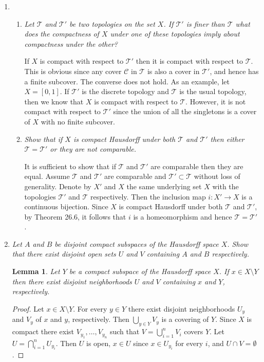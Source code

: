 \documentclass[10pt]{article}
\newcommand{\T}{\mathcal{T}}
\newtheorem{lemma}{Lemma}
\begin{document}
\begin{enumerate}
\item 
\begin{enumerate}
\item \emph{Let $\T$ and $\T'$ be two topologies on the set $X$.  If $\T'$ is finer than $\T$ what does the compactness of $X$ under one of these topologies imply about compactness under the other?}

If $X$ is compact with respect to $\T'$ then it is compact with respect to $\T$.  This is obvious since any cover $\mathcal{C}$ in $\T$ is also a cover in $\T'$, and hence has a finite subcover.  The converse does not hold.  As an example, let $X = [0,1]$.  If $\T'$ is the discrete topology and $\T$ is the usual topology, then we know that $X$ is compact with respect to $\T$.  However, it is not compact with respect to $\T'$ since the union of all the singletons is a cover of $X$ with no finite subcover.

\item \emph{Show that if $X$ is compact Hausdorff under both $\T$ and $\T'$ then either $\T = \T'$ or they are not comparable.}

It is sufficient to show that if $\T$ and $\T'$ are comparable then they are equal.  Assume $\T$ and $\T'$ are comparable and $\T' \subset \T$ without loss of generality.  Denote by $X'$ and $X$ the same underlying set $X$ with the topologies $\T'$ and $\T$ respectively.  Then the inclusion map $i: X' \rightarrow X$ is a continuous bijection.  Since $X$ is compact Hausdorff under both $\T$ and $\T'$, by Theorem 26.6, it follows that $i$ is a homeomorphism and hence $\T = \T'$.

\end{enumerate}

\item \emph{Let $A$ and $B$ be disjoint compact subspaces of the Hausdorff space $X$.  Show that there exist disjoint open sets $U$ and $V$ containing $A$ and $B$ respectively.}
\begin{lemma}\label{compact_hausdorff}Let $Y$ be a compact subspace of the Hausdorff space $X$.  If $x \in X \setminus Y$ then there exist disjoint neighborhoods $U$ and $V$ containing $x$ and $Y$, respectively.
\end{lemma}
\begin{proof}Let $x \in X \setminus Y$.  For every $y \in Y$ there exist disjoint neighborhoods $U_y$ and $V_y$ of $x$ and $y$, respectively.  Then $\bigcup_{y \in Y} V_y$ is a covering of $Y$.  Since $X$ is compact there exist $V_{y_1}, \ldots, V_{y_n}$  such that $V = \bigcup_{i=1}^n V_i$ covers $Y$.  Let $U = \bigcap_{i=1}^n U_{y_i}$.  Then $U$ is open, $x \in U$ since $x \in U_{y_i}$ for every $i$, and $U \cap V = \emptyset$.
\end{proof}


\end{enumerate}
\end{document}
